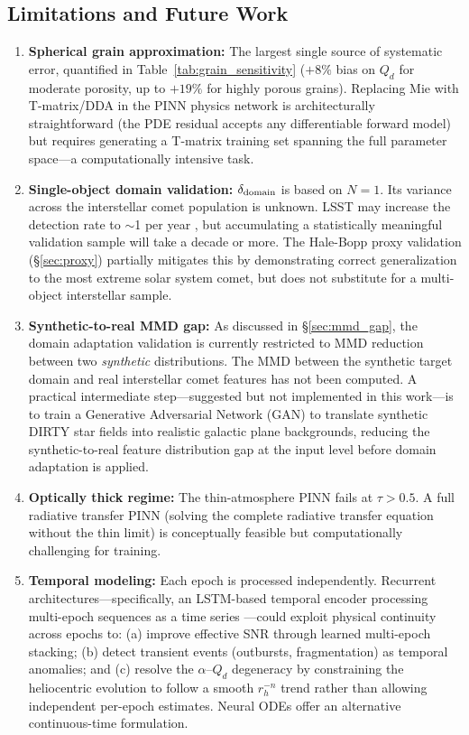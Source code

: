 \documentclass[preprint2]{aastex631}
\begin{document}
\subsection{Limitations and Future Work}

\begin{enumerate}
    \item \textbf{Spherical grain approximation:} The largest single source of systematic error, quantified in Table~\ref{tab:grain_sensitivity} ($+8\%$ bias on $Q_d$ for moderate porosity, up to $+19\%$ for highly porous grains). Replacing Mie with T-matrix/DDA in the PINN physics network is architecturally straightforward (the PDE residual accepts any differentiable forward model) but requires generating a T-matrix training set spanning the full parameter space---a computationally intensive task.
    \item \textbf{Single-object domain validation:} $\delta_{\rm domain}$ is based on $N=1$. Its variance across the interstellar comet population is unknown. LSST may increase the detection rate to $\sim$1 per year \citep{jones18}, but accumulating a statistically meaningful validation sample will take a decade or more. The Hale-Bopp proxy validation (\S\ref{sec:proxy}) partially mitigates this by demonstrating correct generalization to the most extreme solar system comet, but does not substitute for a multi-object interstellar sample.
    \item \textbf{Synthetic-to-real MMD gap:} As discussed in \S\ref{sec:mmd_gap}, the domain adaptation validation is currently restricted to MMD reduction between two \textit{synthetic} distributions. The MMD between the synthetic target domain and real interstellar comet features has not been computed. A practical intermediate step---suggested but not implemented in this work---is to train a Generative Adversarial Network (GAN) to translate synthetic DIRTY star fields into realistic galactic plane backgrounds, reducing the synthetic-to-real feature distribution gap at the input level before domain adaptation is applied.
    \item \textbf{Optically thick regime:} The thin-atmosphere PINN fails at $\tau > 0.5$. A full radiative transfer PINN (solving the complete radiative transfer equation without the thin limit) is conceptually feasible but computationally challenging for training.
    \item \textbf{Temporal modeling:} Each epoch is processed independently. Recurrent architectures---specifically, an LSTM-based temporal encoder processing multi-epoch sequences as a time series \citep{hochreiter97}---could exploit physical continuity across epochs to: (a) improve effective SNR through learned multi-epoch stacking; (b) detect transient events (outbursts, fragmentation) as temporal anomalies; and (c) resolve the $\alpha$--$Q_d$ degeneracy by constraining the heliocentric evolution to follow a smooth $r_h^{-n}$ trend rather than allowing independent per-epoch estimates. Neural ODEs \citep{chen18} offer an alternative continuous-time formulation.

\end{enumerate}
\end{document}
